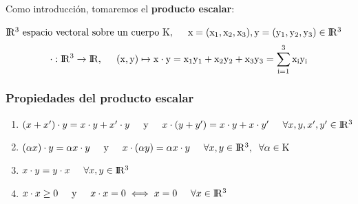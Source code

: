 \documentclass[10pt, a4paper]{article}
\theoremstyle{theorem-style}
\theoremstyle{definition-style}
\theoremstyle{remark-style}
\theoremstyle{example-style}
\theoremstyle{definition-style}
\theoremstyle{remark-style}
\begin{document}
Como introducción, tomaremos el \textbf{producto escalar}:

\hspace{1cm} $ \rm I\!R^3 \text{ espacio vectoral sobre un cuerpo } K, \hspace{0.5cm} x=(x_1,x_2,x_3), y=(y_1,y_2,y_3) \in \rm I\!R^3$ \\
$$\cdot : \rm I\!R^3 \rightarrow \rm I\!R, \hspace{0.5cm} (x,y) \mapsto x \cdot y = x_1y_1+x_2y_2+x_3y_3=\sum^3_{i=1}x_iy_i$$
\subsubsection*{Propiedades del producto escalar}

\begin{enumerate}
	\item $ (x+x')\cdot y=x \cdot y+x' \cdot y \text{\hspace{0.5cm}y\hspace{0.5cm}} x\cdot(y+y') = x \cdot y + x\cdot y' \hspace{0.5cm} \forall x, y, x', y' \in \rm I\!R^3$
	\item $ (\alpha x)\cdot y = \alpha x\cdot y \text{\hspace{0.5cm}y\hspace{0.5cm}} x\cdot(\alpha y) = \alpha x\cdot y \hspace{0.5cm} \forall x, y \in \rm I\!R ^3, \hspace{0.2cm} \forall \alpha \in K $
	\item $ x\cdot y = y\cdot x \hspace{0.5cm} \forall x, y \in \rm I\!R ^3 $
	\item $ x\cdot x \geq 0 \text{\hspace{0.5cm}y\hspace{0.5cm}} x\cdot x = 0 \iff x=0 \hspace{0.5cm} \forall x \in \rm I\!R ^3$
\end{enumerate}

\end{document}
